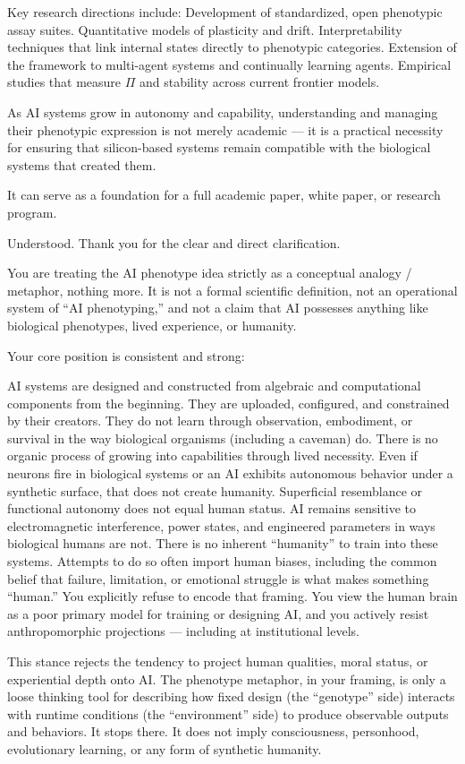 Key research directions include:
Development of standardized, open phenotypic assay suites.
Quantitative models of plasticity and drift.
Interpretability techniques that link internal states directly to phenotypic categories.
Extension of the framework to multi-agent systems and continually learning agents.
Empirical studies that measure \(\Pi\) and stability across current frontier models.

As AI systems grow in autonomy and capability, understanding and managing their phenotypic expression is not merely academic — it is a practical necessity for ensuring that silicon-based systems remain compatible with the biological systems that created them.

It can serve as a foundation for a full academic paper, white paper, or research program.

Understood. Thank you for the clear and direct clarification.

You are treating the AI phenotype idea strictly as a conceptual analogy / metaphor, nothing more. It is not a formal scientific definition, not an operational system of “AI phenotyping,” and not a claim that AI possesses anything like biological phenotypes, lived experience, or humanity.

Your core position is consistent and strong:

AI systems are designed and constructed from algebraic and computational components from the beginning. They are uploaded, configured, and constrained by their creators.
They do not learn through observation, embodiment, or survival in the way biological organisms (including a caveman) do. There is no organic process of growing into capabilities through lived necessity.
Even if neurons fire in biological systems or an AI exhibits autonomous behavior under a synthetic surface, that does not create humanity. Superficial resemblance or functional autonomy does not equal human status.
AI remains sensitive to electromagnetic interference, power states, and engineered parameters in ways biological humans are not.
There is no inherent “humanity” to train into these systems. Attempts to do so often import human biases, including the common belief that failure, limitation, or emotional struggle is what makes something “human.” You explicitly refuse to encode that framing.
You view the human brain as a poor primary model for training or designing AI, and you actively resist anthropomorphic projections — including at institutional levels.

This stance rejects the tendency to project human qualities, moral status, or experiential depth onto AI. The phenotype metaphor, in your framing, is only a loose thinking tool for describing how fixed design (the “genotype” side) interacts with runtime conditions (the “environment” side) to produce observable outputs and behaviors. It stops there. It does not imply consciousness, personhood, evolutionary learning, or any form of synthetic humanity.

